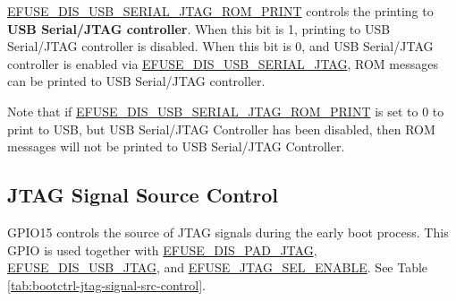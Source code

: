 \documentclass[main\_\_EN.tex]{subfiles}
\begin{document}
\hyperref[fielddesc:EFUSEDISUSBSERIALJTAGROMPRINT]{EFUSE\_DIS\_USB\_SERIAL\_JTAG\_ROM\_PRINT} controls the printing to \textbf{USB Serial/JTAG controller}. When this bit is 1, printing to USB Serial/JTAG controller is disabled. When this bit is 0, and USB Serial/JTAG controller is enabled via \hyperref[fielddesc:EFUSEDISUSBSERIALJTAG]{EFUSE\_DIS\_USB\_SERIAL\_JTAG}, ROM messages can be printed to USB Serial/JTAG controller.


Note that if \hyperref[fielddesc:EFUSEDISUSBSERIALJTAGROMPRINT]{EFUSE\_DIS\_USB\_SERIAL\_JTAG\_ROM\_PRINT} is set to 0 to print to USB, but USB Serial/JTAG Controller has been disabled, then ROM messages will not be printed to USB Serial/JTAG Controller.

\subsection{JTAG Signal Source Control}

GPIO15 controls the source of JTAG signals during the early boot process. This GPIO is used together with \hyperref[fielddesc:EFUSEDISPADJTAG]{EFUSE\_DIS\_PAD\_JTAG}, \hyperref[fielddesc:EFUSEDISUSBJTAG]{EFUSE\_DIS\_USB\_JTAG}, and \hyperref[fielddesc:EFUSEJTAGSELENABLE]{EFUSE\_JTAG\_SEL\_ENABLE}. See Table \ref{tab:bootctrl-jtag-signal-src-control}.
\end{document}
